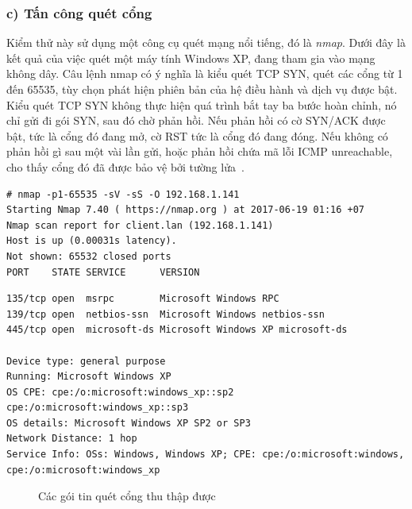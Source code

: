\subsubsection*{c) Tấn công quét cổng}
Kiểm thử này sử dụng một công cụ quét mạng nổi tiếng, đó là \emph{nmap}. Dưới đây là kết quả của việc quét một máy tính Windows XP, đang tham gia vào mạng không dây. Câu lệnh nmap có ý nghĩa là kiểu quét TCP SYN, quét các cổng từ 1 đến 65535, tùy chọn phát hiện phiên bản của hệ điều hành và dịch vụ được bật. Kiểu quét TCP SYN không thực hiện quá trình bắt tay ba bước hoàn chỉnh, nó chỉ gửi đi gói SYN, sau đó chờ phản hồi. Nếu phản hồi có cờ SYN/ACK được bật, tức là cổng đó đang mở, cờ RST tức là cổng đó đang đóng. Nếu không có phản hồi gì sau một vài lần gửi, hoặc phản hồi chứa mã lỗi ICMP unreachable, cho thấy cổng đó đã được bảo vệ bởi tường lửa~\cite{lyon2009nmap}.\\

\begin{lstlisting}
# nmap -p1-65535 -sV -sS -O 192.168.1.141
Starting Nmap 7.40 ( https://nmap.org ) at 2017-06-19 01:16 +07
Nmap scan report for client.lan (192.168.1.141)
Host is up (0.00031s latency).
Not shown: 65532 closed ports
PORT    STATE SERVICE      VERSION
\end{lstlisting}


\begin{lstlisting}
135/tcp open  msrpc        Microsoft Windows RPC
139/tcp open  netbios-ssn  Microsoft Windows netbios-ssn
445/tcp open  microsoft-ds Microsoft Windows XP microsoft-ds

Device type: general purpose
Running: Microsoft Windows XP
OS CPE: cpe:/o:microsoft:windows_xp::sp2 cpe:/o:microsoft:windows_xp::sp3
OS details: Microsoft Windows XP SP2 or SP3
Network Distance: 1 hop
Service Info: OSs: Windows, Windows XP; CPE: cpe:/o:microsoft:windows, cpe:/o:microsoft:windows_xp
\end{lstlisting}

\begin{figure}[H]
    \centering
    \caption{
        \label{fig:port-scanning-139}
        Các gói tin quét cổng thu thập được}
\end{figure}


